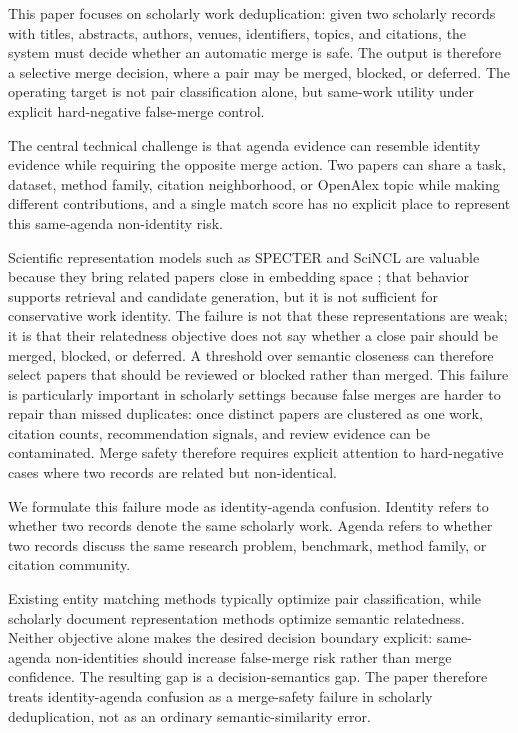 \documentclass[11pt]{article}
\begin{document}
This paper focuses on scholarly work deduplication: given two scholarly records with titles, abstracts, authors, venues, identifiers, topics, and citations, the system must decide whether an automatic merge is safe. The output is therefore a selective merge decision, where a pair may be merged, blocked, or deferred. The operating target is not pair classification alone, but same-work utility under explicit hard-negative false-merge control.

The central technical challenge is that agenda evidence can resemble identity evidence while requiring the opposite merge action. Two papers can share a task, dataset, method family, citation neighborhood, or OpenAlex topic while making different contributions, and a single match score has no explicit place to represent this same-agenda non-identity risk.

Scientific representation models such as SPECTER and SciNCL are valuable because they bring related papers close in embedding space \citep{cohan2020specter,ostendorff2022scincl}; that behavior supports retrieval and candidate generation, but it is not sufficient for conservative work identity. The failure is not that these representations are weak; it is that their relatedness objective does not say whether a close pair should be merged, blocked, or deferred. A threshold over semantic closeness can therefore select papers that should be reviewed or blocked rather than merged. This failure is particularly important in scholarly settings because false merges are harder to repair than missed duplicates: once distinct papers are clustered as one work, citation counts, recommendation signals, and review evidence can be contaminated. Merge safety therefore requires explicit attention to hard-negative cases where two records are related but non-identical.

We formulate this failure mode as identity-agenda confusion. Identity refers to whether two records denote the same scholarly work. Agenda refers to whether two records discuss the same research problem, benchmark, method family, or citation community.

Existing entity matching methods \citep{fellegi1969record,mudgal2018deep,li2020ditto} typically optimize pair classification, while scholarly document representation methods optimize semantic relatedness. Neither objective alone makes the desired decision boundary explicit: same-agenda non-identities should increase false-merge risk rather than merge confidence. The resulting gap is a decision-semantics gap. The paper therefore treats identity-agenda confusion as a merge-safety failure in scholarly deduplication, not as an ordinary semantic-similarity error.
\end{document}
